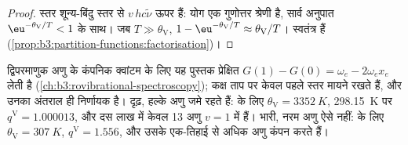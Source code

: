 \begin{proof}
स्तर शून्य-बिंदु स्तर से $v\,hc\tilde\nu$ ऊपर हैं: योग एक गुणोत्तर श्रेणी है,
सार्व अनुपात $\eu^{-\theta_{\mathrm V}/T} < 1$ के साथ। जब $T \gg \theta_{\mathrm V}$, $1 - \eu^{-\theta_{\mathrm V}/T} \approx \theta_{\mathrm V}/T$।
 स्वतंत्र हैं (\cref{prop:b3:partition-functions:factorisation})।
\end{proof}

द्विपरमाणुक अणु के कंपनिक क्वांटम के लिए यह पुस्तक
प्रेक्षित  $G(1) - G(0) = \omega_e - 2\omega_ex_e$ लेती है
(\cref{ch:b3:rovibrational-spectroscopy}); कक्ष ताप पर केवल पहले
स्तर मायने रखते हैं, और उनका अंतराल ही निर्णायक है। दृढ़, हल्के अणु
जमे रहते हैं:  के लिए $\theta_{\mathrm V} = \qty{3352}{K}$, \qty{298.15}{K} पर $q^{\mathrm V} = 1.000013$, और
दस लाख में केवल 13 अणु $v = 1$ में हैं। भारी, नरम अणु ऐसे नहीं: 
के लिए $\theta_{\mathrm V} = \qty{307}{K}$, $q^{\mathrm V} = 1.556$, और उसके एक-तिहाई से अधिक अणु
कंपन करते हैं।

